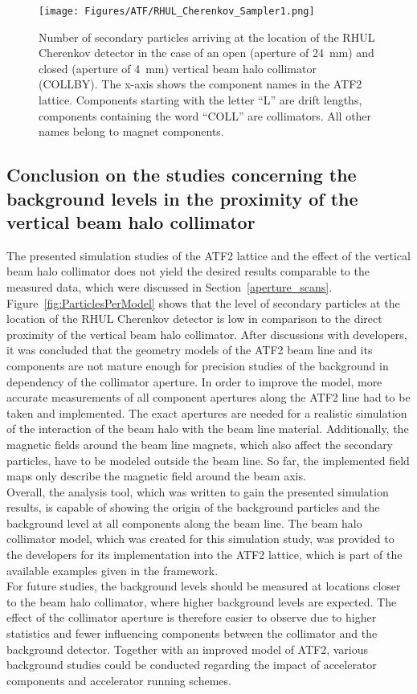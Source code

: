 \begin{figure}[!h]
\centering
\texttt{[image: Figures/ATF/RHUL\_Cherenkov\_Sampler1.png]}
\caption[Number of particles at the RHUL Cherenkov detector]{Number of secondary particles arriving at the location of the RHUL Cherenkov detector in the case of an open (aperture of \SI[detect-all]{24}{\milli\meter}) and closed (aperture of \SI[detect-all]{4}{\milli\meter}) vertical beam halo collimator (COLLBY).
The x-axis shows the component names in the ATF2 lattice.
Components starting with the letter ``L'' are drift lengths, components containing the word ``COLL'' are collimators.
All other names belong to magnet components.}
\label{fig:RHUL_Cherenkov_Sampler}
\end{figure}

\subsection{Conclusion on the studies concerning the background levels in the proximity of the vertical beam halo collimator}
The presented \bdsim simulation studies of the ATF2 lattice and the effect of the vertical beam halo collimator does not yield the desired results comparable to the measured data, which were discussed in Section~\ref{aperture_scans}.
Figure~\ref{fig:ParticlesPerModel} shows that the level of secondary particles at the location of the RHUL Cherenkov detector is low in comparison to the direct proximity of the vertical beam halo collimator.
After discussions with \bdsim developers, it was concluded that the geometry models of the ATF2 beam line and its components are not mature enough for precision studies of the background in dependency of the collimator aperture.
In order to improve the model, more accurate measurements of all component apertures along the ATF2 line had to be taken and implemented.
The exact apertures are needed for a realistic simulation of the interaction of the beam halo with the beam line material.
Additionally, the magnetic fields around the beam line magnets, which also affect the secondary particles, have to be modeled outside the beam line.
So far, the implemented field maps only describe the magnetic field around the beam axis.
\\Overall, the analysis tool, which was written to gain the presented simulation results, is capable of showing the origin of the background particles and the background level at all components along the beam line.
The beam halo collimator model, which was created for this simulation study, was provided to the \bdsim developers for its implementation into the ATF2 lattice, which is part of the available examples given in the \bdsim framework.
\\For future studies, the background levels should be measured at locations closer to the beam halo collimator, where higher background levels are expected.
The effect of the collimator aperture is therefore easier to observe due to higher statistics and fewer influencing components between the collimator and the background detector.
Together with an improved \bdsim model of ATF2, various background studies could be conducted regarding the impact of accelerator components and accelerator running schemes.

